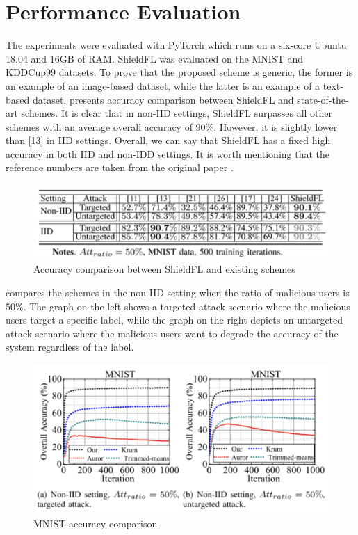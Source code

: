 \section{Performance Evaluation}
\label{sec:performance-eval}

The experiments were evaluated with PyTorch which runs on a six-core Ubuntu 18.04 and 16GB of RAM.
ShieldFL was evaluated on the MNIST \cite{deng2012mnist} and KDDCup99 \cite{tavallaee2009detailed} datasets.
To prove that the proposed scheme is generic, the former is an example of an image-based dataset, while the latter is an example of a text-based dataset.
 presents accuracy comparison between ShieldFL and state-of-the-art schemes.
It is clear that in non-IID settings, ShieldFL surpasses all other schemes with an average overall accuracy of $90\%$.
However, it is slightly lower than [13] in IID settings.
Overall, we can say that ShieldFL has a fixed high accuracy in both IID and non-IDD settings.
It is worth mentioning that the reference numbers are taken from the original paper \cite{ma2022shieldfl}.

\begin{figure}[thb]
\centering
  \includegraphics[width=0.8\linewidth]{resources/accuracy-comparison-table.pdf}
  \caption{Accuracy comparison between ShieldFL and existing schemes}
  \label{fig:acc-comparison}
\end{figure}

 compares the schemes in the non-IID setting when the ratio of malicious users is $50\%$.
The graph on the left shows a targeted attack scenario where the malicious users target a specific label, while the graph on the right depicts an untargeted attack scenario where the malicious users want to degrade the accuracy of the system regardless of the label.

\begin{figure}[thb]
\centering
  \includegraphics[width=0.8\linewidth]{resources/mnist-accuracy-comparison.pdf}
  \caption{MNIST accuracy comparison}
  \label{fig:mnsist-accuracy-comparison}
\end{figure}

